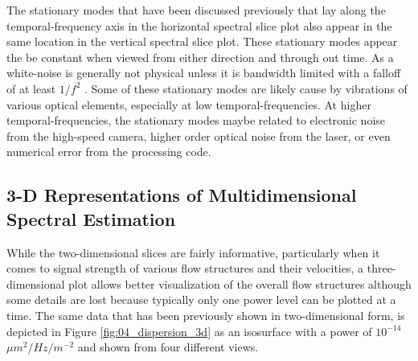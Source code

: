 The stationary modes that have been discussed previously that lay along the temporal-frequency axis in the horizontal spectral slice plot also appear in the same location in the vertical spectral slice plot.
These stationary modes appear the be constant when viewed from either direction and through out time.
As a white-noise is generally not physical unless it is bandwidth limited with a falloff of at least $1/f^2$ \cite{Blackman-1958-4QtKgDb8}.
Some of these stationary modes are likely cause by vibrations of various optical elements, especially at low temporal-frequencies.
At higher temporal-frequencies, the stationary modes maybe related to electronic noise from the high-speed camera, higher order optical noise from the laser, or even numerical error from the processing code.

\subsection{3-D Representations of Multidimensional Spectral Estimation}
While the two-dimensional slices are fairly informative, particularly when it comes to signal strength of various flow structures and their velocities, a three-dimensional plot allows better visualization of the overall flow structures although some details are lost because typically only one power level can be plotted at a time.
The same data that has been previously shown in two-dimensional form, is depicted in Figure \ref{fig:04_dispersion_3d} as an isosurface with a power of $10^{-14}$ $\mu m^2/Hz/m^{-2}$ and shown from four different views.

